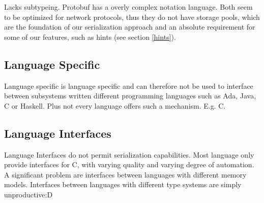 Lacks subtypeing. Protobuf has a overly complex notation language. Both seem to be optimized for network protocols, thus they do not have storage pools, which are the foundation of our serialization approach and an absolute requirement for some of our features, such as hints (see section \ref{hints}).


\subsection*{Language Specific}

Language specific is language specific and can therefore not be used to interface between subsystems written different programming languages such as Ada, Java, C or Haskell. Plus not every language offers such a mechanism. E.g. C.


\subsection*{Language Interfaces}
Language Interfaces do not permit serialization capabilities. Most language only provide interfaces for C, with varying quality and varying degree of automation. A significant problem are interfaces between languages with different memory models.
Interfaces between languages with different type systems are simply unproductive:D
